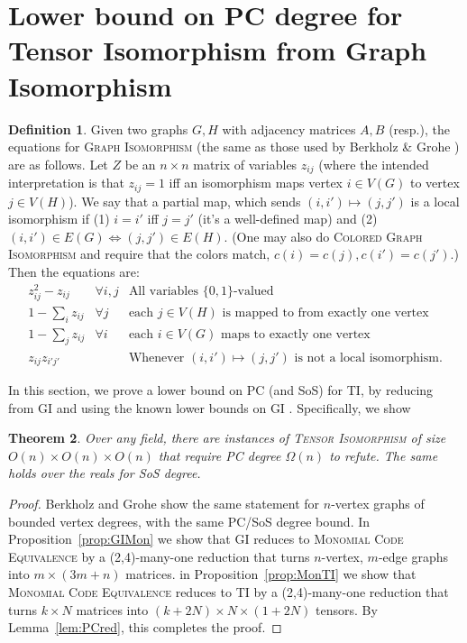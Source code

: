 \documentclass[10pt,a4paper]{article}
\newtheorem{theorem}{Theorem}[section]
\theoremstyle{definition}
\newtheorem{definition}[theorem]{Definition}
\begin{document}
\medskip




\setcounter{section}{4}



\section{Lower bound on PC degree for Tensor Isomorphism from Graph Isomorphism} \label{sec:lowerboundGI}
\begin{definition} \label{def:GI}
Given two graphs $G,H$ with adjacency matrices $A,B$ (resp.), the equations for \textsc{Graph Isomorphism} (the same as those used by Berkholz \& Grohe \cite{BerkholzG15,BerkholzG16}) are as follows. Let $Z$ be an $n \times n$ matrix of variables $z_{ij}$ (where the intended interpretation is that $z_{ij}=1$ iff an isomorphism maps vertex $i \in V(G)$ to vertex $j \in V(H)$). We say that a partial map, which sends $(i,i') \mapsto (j,j')$ is a local isomorphism if (1) $i=i'$ iff $j=j'$ (it's a well-defined map) and (2) $(i,i') \in E(G) \Leftrightarrow (j,j') \in E(H)$. (One may also do \textsc{Colored Graph Isomorphism} and require that the colors match, $c(i) = c(j), c(i')=c(j')$.) Then the equations are:
\[
\begin{array}{rll}
z_{ij}^2 - z_{ij} & \forall i,j & \text{All variables $\{0,1\}$-valued} \\
1 - \sum_i z_{ij} & \forall j & \text{each $j \in V(H)$ is mapped to from exactly one vertex} \\
1 - \sum_j z_{ij} & \forall i & \text{each $i \in V(G)$ maps to exactly one vertex} \\
z_{ij} z_{i'j'} & & \text{Whenever $(i,i') \mapsto (j,j')$ is not a local isomorphism}.
\end{array}
\]
\end{definition}

In this section, we prove a lower bound on PC (and SoS) for \textsc{TI}, by reducing from \textsc{GI} and using the known lower bounds on \textsc{GI} \cite{BerkholzG15,BerkholzG16}. Specifically, we show

\begin{theorem}
Over any field, there are instances of \textsc{Tensor Isomorphism} of size $O(n) \times O(n) \times O(n)$ that require PC degree $\Omega(n)$ to refute. The same holds over the reals for SoS degree.
\end{theorem}

\begin{proof}
Berkholz and Grohe \cite{BerkholzG15,BerkholzG16} show the same statement for $n$-vertex graphs of bounded vertex degrees, with the same PC/SoS degree bound. In Proposition~\ref{prop:GIMon} we show that \textsc{GI} reduces to \textsc{Monomial Code Equivalence} by a (2,4)-many-one reduction that turns $n$-vertex, $m$-edge graphs into $m \times (3m+n)$ matrices. in Proposition~\ref{prop:MonTI} we show that \textsc{Monomial Code Equivalence} reduces to \textsc{TI} by a (2,4)-many-one reduction that turns $k \times N$ matrices into $(k + 2N) \times N \times (1 + 2N)$ tensors. By Lemma~\ref{lem:PCred}, this completes the proof.
\end{proof}
\end{document}
